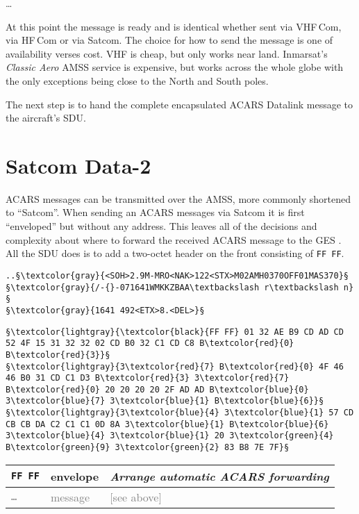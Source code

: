 \documentclass[tikz,a4paper,12pt]{article}
\begin{document}
\dots

At this point the message is ready and is identical whether sent via
VHF\,Com, via HF\,Com or via Satcom.  The choice for how to send the
message is one of availability verses cost.  VHF is cheap, but only
works near land.  Inmarsat's \emph{Classic Aero} \acrshort{AMSS} service is expensive, but works across the
whole globe with the only exceptions being close to the North and
South poles.

The next step is to hand the complete encapsulated ACARS Datalink
message to the aircraft's \gls{SDU}.

\section{Satcom Data-2}

ACARS messages can be transmitted over the \gls{AMSS}, more commonly shortened to ``Satcom''.
When sending an ACARS messages via Satcom it is first ``enveloped'' but without any address.
This leaves all of the decisions and complexity about where to forward the received ACARS message to
the \gls{GES} .  All the
\acrlong{SDU} does is to add a two-octet header on the
front consisting of \texttt{FF~FF}.
\vfill
\begin{lstlisting}[language=ACARS,linewidth=\textwidth]
..§\textcolor{gray}{<SOH>2.9M-MRO<NAK>122<STX>M02AMH0370OFF01MAS370}§    §\textcolor{gray}{/-{}-071641WMKKZBAA\textbackslash r\textbackslash n}§
§\textcolor{gray}{1641 492<ETX>8.<DEL>}§
\end{lstlisting}

\begin{lstlisting}[language=ACARS]
§\textcolor{lightgray}{\textcolor{black}{FF FF} 01 32 AE B9 CD AD CD 52 4F 15 31 32 32 02 CD B0 32 C1 CD C8 B\textcolor{red}{0} B\textcolor{red}{3}}§
§\textcolor{lightgray}{3\textcolor{red}{7} B\textcolor{red}{0} 4F 46 46 B0 31 CD C1 D3 B\textcolor{red}{3} 3\textcolor{red}{7} B\textcolor{red}{0} 20 20 20 20 2F AD AD B\textcolor{blue}{0} 3\textcolor{blue}{7} 3\textcolor{blue}{1} B\textcolor{blue}{6}}§
§\textcolor{lightgray}{3\textcolor{blue}{4} 3\textcolor{blue}{1} 57 CD CB CB DA C2 C1 C1 0D 8A 3\textcolor{blue}{1} B\textcolor{blue}{6} 3\textcolor{blue}{4} 3\textcolor{blue}{1} 20 3\textcolor{green}{4} B\textcolor{green}{9} 3\textcolor{green}{2} 83 B8 7E 7F}§
\end{lstlisting}

\begin{center}
\begin{tabular}{p{1.5cm}p{2cm}p{8cm}}
\hfill\texttt{FF FF}&envelope&\emph{Arrange automatic ACARS forwarding}\\
\hline
\hfill\textcolor{gray}{\texttt{\ldots}}&\textcolor{gray}{message}&\textcolor{gray}{[see above]}\\
\end{tabular}
\end{center}
\end{document}
